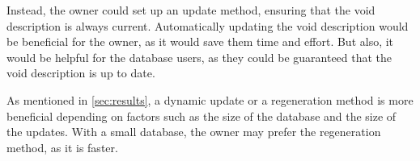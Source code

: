 Instead, the owner could set up an update method, ensuring that the \gls{void} description is always current. Automatically updating the \gls{void} description would be beneficial for the owner, as it would save them time and effort. But also, it would be helpful for the database users, as they could be guaranteed that the \gls{void} description is up to date.

As mentioned in \autoref{sec:results}, a dynamic update or a regeneration method is more beneficial depending on factors such as the size of the database and the size of the updates. With a small database, the owner may prefer the regeneration method, as it is faster.













